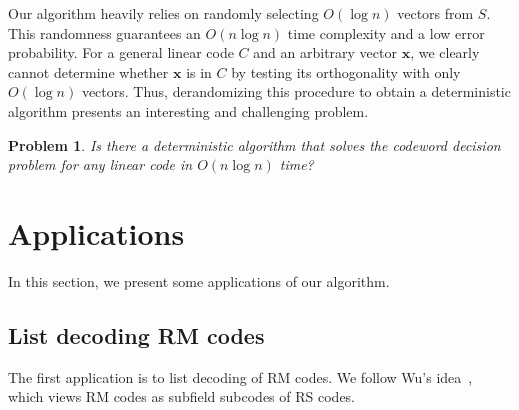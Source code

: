 \documentclass[a4paper, 10pt]{article}
\newtheorem{prob}[theorem]{Problem}
\begin{document}
Our algorithm heavily relies on randomly selecting $O(\log n)$ vectors from $S$. This randomness guarantees an $O(n \log n)$ time complexity and a low error probability. For a general linear code $C$ and an arbitrary vector $\textbf{x}$, we clearly cannot determine whether $\textbf{x}$ is in $C$ by testing its orthogonality with only $O(\log n)$ vectors. Thus, derandomizing this procedure to obtain a deterministic algorithm presents an interesting and challenging problem.
\begin{prob}
    Is there a deterministic algorithm that solves the codeword decision problem for any linear code in $O(n\log n)$ time?
\end{prob}



\section{Applications}
In this section, we present some applications of our algorithm. 

\subsection{List decoding RM codes}
The first application is to list decoding of RM codes. We follow Wu's idea~\cite{1278668}, which views RM codes as subfield subcodes of RS codes.
\end{document}
